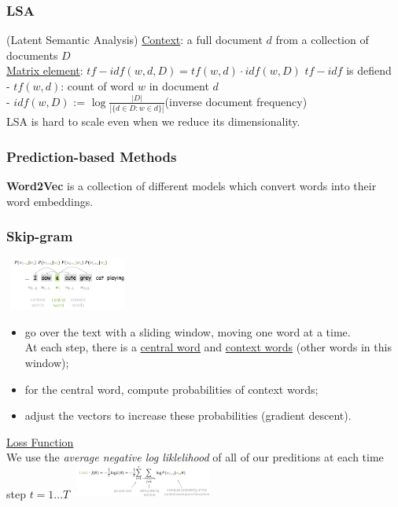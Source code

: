 \documentclass[8pt]{extarticle} %
\begin{document}
\begin{multicols*}{3}
\subsubsection*{LSA} (Latent Semantic Analysis)
\underline{Context}: a full document $d$ from a collection of documents $D$\\
\underline{Matrix element}: $tf-idf(w, d, D) = tf(w, d) \cdot idf(w, D)$
$tf-idf$ is defiend\\
- $tf(w, d)$: count of word $w$ in document $d$\\
- $idf(w, D)$ := $\log \frac{|D|}{|\{d \in D: w \in d\}|}$(inverse document frequency)\\

LSA is hard to scale even when we reduce its dimensionality.

\subsubsection*{Prediction-based Methods}
\textbf{Word2Vec} is a collection of different models which convert words into their word embeddings. 

\subsubsection*{Skip-gram} 
\begin{center}
    \includegraphics[width=0.3\textwidth]{media/skipgram.png}
\end{center}
\begin{itemize}
    \item go over the text with a sliding window, moving one word at a time.\\
    At each step, there is a \underline{central word} and \underline{context words} (other words in this window);
    \item for the central word, compute probabilities of context words;
    \item adjust the vectors to increase these probabilities (gradient descent).
\end{itemize}

\underline{Loss Function}\\
We use the \textit{average negative log liklelihood} of all of our preditions at each time step $t= 1\dots T$
\includegraphics[width=0.35\textwidth]{media/skigram-loss.png}


\end{multicols*}
\end{document}
